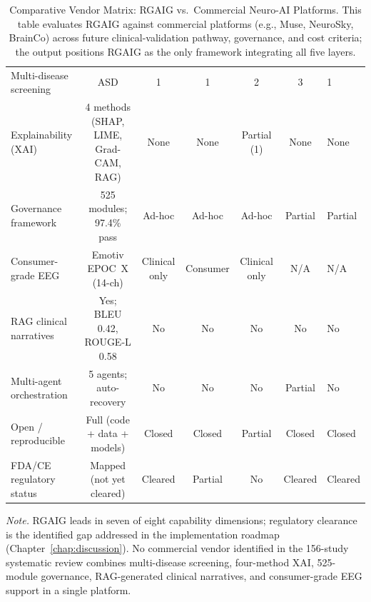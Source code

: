 \begin{table}[!htbp]
\tablestripes\tablefontsize
\caption[Comparative Vendor Matrix: RGAIG vs.Commercial Neuro-AI]{Comparative Vendor Matrix: RGAIG vs.\ Commercial Neuro-AI Platforms. This table evaluates RGAIG against commercial platforms (e.g., Muse, NeuroSky, BrainCo) across future clinical-validation pathway, governance, and cost criteria; the output positions RGAIG as the only framework integrating all five layers.}
\tablefontsize
\begin{tabularx}{\textwidth}{@{} >{\raggedright\arraybackslash}p{2.8cm} C C C C C L @{}}
\toprule
{} &  &  &  &  &  &  \\
\midrule
Multi-disease screening & ASD & 1 & 1 & 2 & 3 & 1 \\
\addlinespace
Explainability (XAI) & 4 methods (SHAP, LIME, Grad-CAM, RAG) & None & None & Partial (1) & None & None \\
\addlinespace
Governance framework & 525 modules; 97.4\% pass & Ad-hoc & Ad-hoc & Ad-hoc & Partial & Partial \\
\addlinespace
Consumer-grade EEG & Emotiv EPOC~X (14-ch) & Clinical only & Consumer & Clinical only & N/A & N/A \\
\addlinespace
RAG clinical narratives & Yes; BLEU 0.42, ROUGE-L 0.58 & No & No & No & No & No \\
\addlinespace
Multi-agent orchestration & 5 agents; auto-recovery & No & No & No & Partial & No \\
\addlinespace
Open / reproducible & Full (code + data + models) & Closed & Closed & Partial & Closed & Closed \\
\addlinespace
FDA/CE regulatory status & Mapped (not yet cleared) & Cleared & Partial & No & Cleared & Cleared \\
\bottomrule
\end{tabularx}
\vspace{0.5em}\noindent\textit{Note.} RGAIG leads in seven of eight capability dimensions; regulatory clearance is the identified gap addressed in the implementation roadmap (Chapter~\ref{chap:discussion}). No commercial vendor identified in the 156-study systematic review combines multi-disease screening, four-method XAI, 525-module governance, RAG-generated clinical narratives, and consumer-grade EEG support in a single platform.
\end{table}
\fi %

